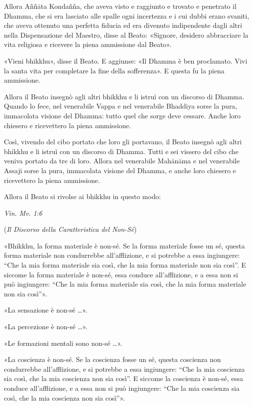 Allora Aññāta Kondañña, che aveva visto e raggiunto e trovato e
penetrato il Dhamma, che si era lasciato alle spalle ogni incertezza e i
cui dubbi erano svaniti, che aveva ottenuto una perfetta fiducia ed era
divenuto indipendente dagli altri nella Dispensazione del Maestro, disse
al Beato: «Signore, desidero abbracciare la vita religiosa e ricevere la
piena ammissione dal Beato».


«Vieni bhikkhu», disse il Beato. E aggiunse: «Il Dhamma è ben
proclamato. Vivi la santa vita per completare la fine della sofferenza».
E questa fu la piena ammissione.


Allora il Beato insegnò agli altri bhikkhu e li istruì con un discorso
di Dhamma. Quando lo fece, nel venerabile Vappa e nel venerabile
Bhaddiya sorse la pura, immacolata visione del Dhamma: tutto quel che
sorge deve cessare. Anche loro chiesero e ricevettero la piena
ammissione.


Così, vivendo del cibo portato che loro gli portavano, il Beato insegnò
agli altri bhikkhu e li istruì con un discorso di Dhamma. Tutti e sei
vissero del cibo che veniva portato da tre di loro. Allora nel
venerabile Mahānāma e nel venerabile Assaji sorse la pura, immacolata
visione del Dhamma, e anche loro chiesero e ricevettero la piena
ammissione.


Allora il Beato si rivolse ai bhikkhu in questo modo:


\emph{Vin. Mv. 1:6}


(\emph{Il Discorso della Caratteristica del Non-Sé})


«Bhikkhu, la forma materiale è non-sé. Se la forma materiale fosse un
sé, questa forma materiale non condurrebbe all’afflizione, e si potrebbe
a essa ingiungere: “Che la mia forma materiale sia così, che la mia
forma materiale non sia così”. E siccome la forma materiale è non-sé,
essa conduce all’afflizione, e a essa non si può ingiungere: “Che la mia
forma materiale sia così, che la mia forma materiale non sia così”».


«La sensazione è non-sé …​».


«La percezione è non-sé …​».


«Le formazioni mentali sono non-sé …​».


«La coscienza è non-sé. Se la coscienza fosse un sé, questa coscienza
non condurrebbe all’afflizione, e si potrebbe a essa ingiungere: “Che la
mia coscienza sia così, che la mia coscienza non sia così”. E siccome la
coscienza è non-sé, essa conduce all’afflizione, e a essa non si può
ingiungere: “Che la mia coscienza sia così, che la mia coscienza non sia
così”».


